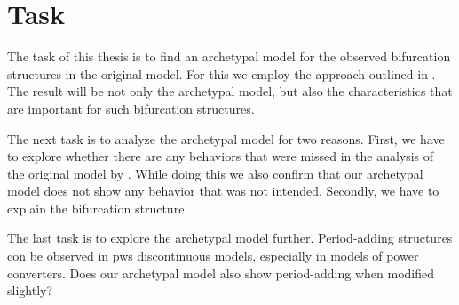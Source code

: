 \chapter{Task}
\label{chap:task}

The task of this thesis is to find an archetypal model for the observed bifurcation structures in the original model.
For this we employ the approach outlined in .
The result will be not only the archetypal model, but also the characteristics that are important for such bifurcation structures.

The next task is to analyze the archetypal model for two reasons.
First, we have to explore whether there are any behaviors that were missed in the analysis of the original model by .
While doing this we also confirm that our archetypal model does not show any behavior that was not intended.
Secondly, we have to explain the bifurcation structure.

The last task is to explore the archetypal model further.
Period-adding structures con be observed in \gls{pws} discontinuous models, especially in models of power converters.
Does our archetypal model also show period-adding when modified slightly?
